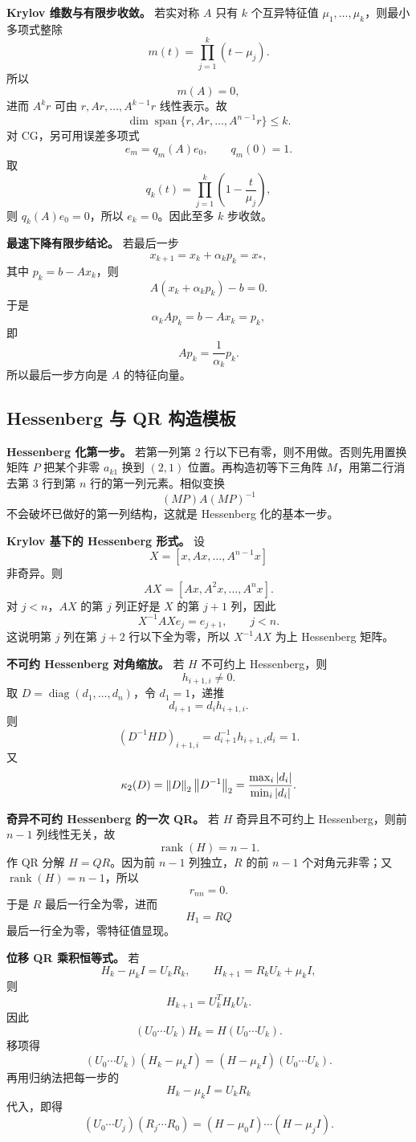 \documentclass{article}
\newcommand{\diag}{\operatorname{diag}}
\newcommand{\rank}{\operatorname{rank}}
\begin{document}
\textbf{Krylov 维数与有限步收敛。} 若实对称 $A$ 只有 $k$ 个互异特征值 $\mu_1,\ldots,\mu_k$，则最小多项式整除
\[
  m(t)=\prod_{j=1}^k(t-\mu_j).
\]
所以
\[
  m(A)=0,
\]
进而 $A^kr$ 可由 $r,Ar,\ldots,A^{k-1}r$ 线性表示。故
\[
  \dim\operatorname{span}\{r,Ar,\ldots,A^{n-1}r\}\le k.
\]
对 CG，另可用误差多项式
\[
  e_m=q_m(A)e_0,\qquad q_m(0)=1.
\]
取
\[
  q_k(t)=\prod_{j=1}^k\left(1-\frac{t}{\mu_j}\right),
\]
则 $q_k(A)e_0=0$，所以 $e_k=0$。因此至多 $k$ 步收敛。

\textbf{最速下降有限步结论。} 若最后一步
\[
  x_{k+1}=x_k+\alpha_kp_k=x_*,
\]
其中 $p_k=b-Ax_k$，则
\[
  A(x_k+\alpha_kp_k)-b=0.
\]
于是
\[
  \alpha_kAp_k=b-Ax_k=p_k,
\]
即
\[
  Ap_k=\frac1{\alpha_k}p_k.
\]
所以最后一步方向是 $A$ 的特征向量。

\subsection{Hessenberg 与 QR 构造模板}

\textbf{Hessenberg 化第一步。} 若第一列第 $2$ 行以下已有零，则不用做。否则先用置换矩阵 $P$ 把某个非零 $a_{k1}$ 换到 $(2,1)$ 位置。再构造初等下三角阵 $M$，用第二行消去第 $3$ 行到第 $n$ 行的第一列元素。相似变换
\[
  (MP)A(MP)^{-1}
\]
不会破坏已做好的第一列结构，这就是 Hessenberg 化的基本一步。

\textbf{Krylov 基下的 Hessenberg 形式。} 设
\[
  X=[x,Ax,\ldots,A^{n-1}x]
\]
非奇异。则
\[
  AX=[Ax,A^2x,\ldots,A^nx].
\]
对 $j<n$，$AX$ 的第 $j$ 列正好是 $X$ 的第 $j+1$ 列，因此
\[
  X^{-1}AXe_j=e_{j+1},\qquad j<n.
\]
这说明第 $j$ 列在第 $j+2$ 行以下全为零，所以 $X^{-1}AX$ 为上 Hessenberg 矩阵。

\textbf{不可约 Hessenberg 对角缩放。} 若 $H$ 不可约上 Hessenberg，则
\[
  h_{i+1,i}\ne0.
\]
取 $D=\diag(d_1,\ldots,d_n)$，令 $d_1=1$，递推
\[
  d_{i+1}=d_i h_{i+1,i}.
\]
则
\[
  (D^{-1}HD)_{i+1,i}=d_{i+1}^{-1}h_{i+1,i}d_i=1.
\]
又
\[
  \kappa_2(D)=\left\| D \right\|_2\left\| D^{-1} \right\|_2
  =\frac{\max_i|d_i|}{\min_i|d_i|}.
\]

\textbf{奇异不可约 Hessenberg 的一次 QR。} 若 $H$ 奇异且不可约上 Hessenberg，则前 $n-1$ 列线性无关，故
\[
  \rank(H)=n-1.
\]
作 QR 分解 $H=QR$。因为前 $n-1$ 列独立，$R$ 的前 $n-1$ 个对角元非零；又 $\rank(H)=n-1$，所以
\[
  r_{nn}=0.
\]
于是 $R$ 最后一行全为零，进而
\[
  H_1=RQ
\]
最后一行全为零，零特征值显现。

\textbf{位移 QR 乘积恒等式。} 若
\[
  H_k-\mu_kI=U_kR_k,\qquad H_{k+1}=R_kU_k+\mu_kI,
\]
则
\[
  H_{k+1}=U_k^TH_kU_k.
\]
因此
\[
  (U_0\cdots U_k)H_k=H(U_0\cdots U_k).
\]
移项得
\[
  (U_0\cdots U_k)(H_k-\mu_kI)
  =(H-\mu_kI)(U_0\cdots U_k).
\]
再用归纳法把每一步的
\[
  H_k-\mu_kI=U_kR_k
\]
代入，即得
\[
  (U_0\cdots U_j)(R_j\cdots R_0)
  =(H-\mu_0I)\cdots(H-\mu_jI).
\]
\end{document}
